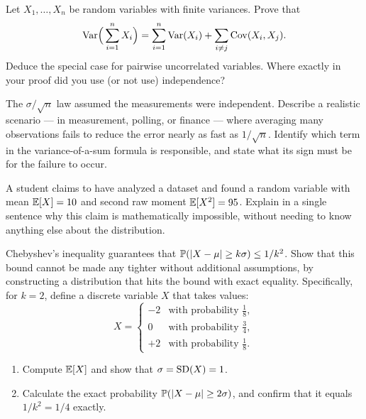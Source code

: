 \begin{exercise}
\label{ch09:exr-proofsum}
Let $X_1,\dots,X_n$ be random variables with finite variances. Prove that
\[
  \operatorname{Var}\!\Big(\sum_{i=1}^n X_i\Big)
  = \sum_{i=1}^n \operatorname{Var}(X_i) + \sum_{i\ne j}\operatorname{Cov}(X_i,X_j).
\]
Deduce the special case for pairwise uncorrelated variables. Where exactly in
your proof did you use (or not use) independence?
\end{exercise}

\begin{exercise}
\label{ch09:exr-concept}
The $\sigma/\sqrt n$ law assumed the measurements were independent. Describe a
realistic scenario --- in measurement, polling, or finance --- where averaging
many observations fails to reduce the error nearly as fast as $1/\sqrt n$.
Identify which term in the variance-of-a-sum formula is responsible, and state
what its sign must be for the failure to occur.
\end{exercise}

\begin{exercise}
\label{ch09:exr-impossible}
A student claims to have analyzed a dataset and found a random variable with
mean $\operatorname{\mathbb{E}}[X] = 10$ and second raw moment $\operatorname{\mathbb{E}}[X^2] = 95$.
Explain in a single sentence why this claim is mathematically impossible,
without needing to know anything else about the distribution.
\end{exercise}

\begin{exercise}
\label{ch09:exr-cheby-sharp}
Chebyshev's inequality guarantees that $\operatorname{\mathbb{P}}(\lvert X-\mu\rvert\ge k\sigma) \le 1/k^2$.
Show that this bound cannot be made any tighter without additional assumptions,
by constructing a distribution that hits the bound with exact equality.
Specifically, for $k=2$, define a discrete variable $X$ that takes values:
\[
  X = \begin{cases}
    -2 & \text{with probability } \tfrac{1}{8}, \\
    0  & \text{with probability } \tfrac{3}{4}, \\
    +2 & \text{with probability } \tfrac{1}{8}.
  \end{cases}
\]
\begin{enumerate}
  \item Compute $\operatorname{\mathbb{E}}[X]$ and show that $\sigma = \operatorname{SD}(X) = 1$.
  \item Calculate the exact probability $\operatorname{\mathbb{P}}(\lvert X-\mu\rvert \ge 2\sigma)$, and confirm
        that it equals $1/k^2 = 1/4$ exactly.
\end{enumerate}
\end{exercise}
